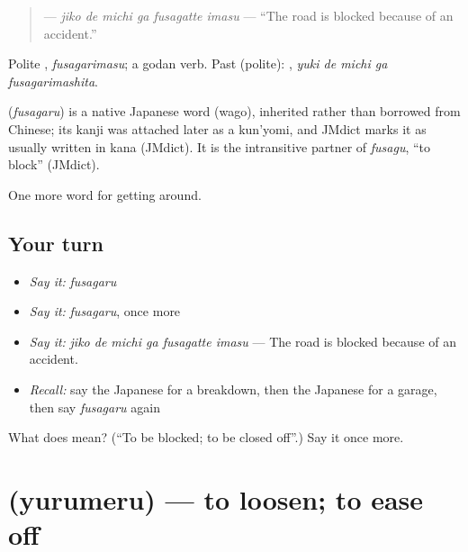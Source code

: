 \begin{quote}
\textbf{  } — \emph{jiko de michi ga fusagatte imasu} — \textquotedblleft{}The road is blocked because of an accident.\textquotedblright{}
\end{quote}

Polite \textbf{}, \emph{fusagarimasu}; a godan verb. Past (polite): \textbf{  }, \emph{yuki de michi ga fusagarimashita}.

\begin{cousinweb}
\textbf{} (\emph{fusagaru}) is a native Japanese word (wago), inherited rather than borrowed from Chinese; its kanji was attached later as a kun'yomi, and JMdict marks it as usually written in kana (JMdict). It is the intransitive partner of \emph{fusagu}, \textquotedblleft{}to block\textquotedblright{} (JMdict).
\end{cousinweb}

\begin{grammarlens}[title={What you've built}]
One more word for getting around.
\end{grammarlens}

\subsection*{Your turn}
\begin{itemize}
\raggedright
  \item \emph{Say it:} \emph{fusagaru}
  \item \emph{Say it:} \emph{fusagaru}, once more
  \item \emph{Say it:} \emph{jiko de michi ga fusagatte imasu} — The road is blocked because of an accident.
  \item \emph{Recall:} say the Japanese for a breakdown, then the Japanese for a garage, then say \emph{fusagaru} again
\end{itemize}

\begin{tcolorbox}[breakable,colback=teal!4,colframe=teal!35!black,title={Before you move on}]
What does  mean? (\textquotedblleft{}To be blocked; to be closed off\textquotedblright{}.) Say it once more.
\end{tcolorbox}
\section[\texorpdfstring{\ja{ゆるめる} (yurumeru)}{ゆるめる (yurumeru)}]{ (yurumeru) — to loosen; to ease off}

